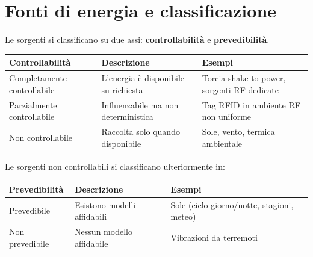 \documentclass[
  italian,
  openany]{book}
\newcounter{none} %
\begin{document}
\section{Fonti di energia e
classificazione}\label{fonti-di-energia-e-classificazione}

Le sorgenti si classificano su due assi: \textbf{controllabilità} e
\textbf{prevedibilità}.

{\def\LTcaptype{none} %
\begin{longtable}[]{@{}
  >{\raggedright\arraybackslash}p{}
  >{\raggedright\arraybackslash}p{}
  >{\raggedright\arraybackslash}p{}@{}}
\toprule\noalign{}
\begin{minipage}[b]{\linewidth}\raggedright
Controllabilità
\end{minipage} & \begin{minipage}[b]{\linewidth}\raggedright
Descrizione
\end{minipage} & \begin{minipage}[b]{\linewidth}\raggedright
Esempi
\end{minipage} \\
\midrule\noalign{}
\endhead
\bottomrule\noalign{}
\endlastfoot
Completamente controllabile & L'energia è disponibile su richiesta &
Torcia shake-to-power, sorgenti RF dedicate \\
Parzialmente controllabile & Influenzabile ma non deterministica & Tag
RFID in ambiente RF non uniforme \\
Non controllabile & Raccolta solo quando disponibile & Sole, vento,
termica ambientale \\
\end{longtable}
}

Le sorgenti non controllabili si classificano ulteriormente in:

{\def\LTcaptype{none} %
\begin{longtable}[]{@{}
  >{\raggedright\arraybackslash}p{}
  >{\raggedright\arraybackslash}p{}
  >{\raggedright\arraybackslash}p{}@{}}
\toprule\noalign{}
\begin{minipage}[b]{\linewidth}\raggedright
Prevedibilità
\end{minipage} & \begin{minipage}[b]{\linewidth}\raggedright
Descrizione
\end{minipage} & \begin{minipage}[b]{\linewidth}\raggedright
Esempi
\end{minipage} \\
\midrule\noalign{}
\endhead
\bottomrule\noalign{}
\endlastfoot
Prevedibile & Esistono modelli affidabili & Sole (ciclo giorno/notte,
stagioni, meteo) \\
Non prevedibile & Nessun modello affidabile & Vibrazioni da terremoti \\
\end{longtable}
}
\end{document}
